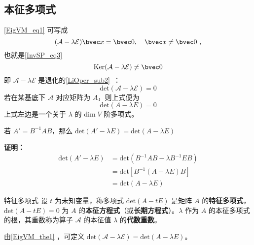 \subsection{本征多项式}
\autoref{EigVM_eq1} 可写成
\begin{equation}
(\mathcal{A-\lambda E})\bvec x=\bvec 0,\quad \bvec x\neq\bvec 0~,
\end{equation}
也就是\autoref{InvSP_eq3}~ 
\begin{equation}
\mathrm{Ker(\mathcal{A}-\lambda\mathcal{E})}\neq\bvec 0
\end{equation}
即 $\mathcal{A-\lambda E}$ 是退化的\autoref{LiOper_sub2}~：
\begin{equation}
\mathrm{det}(\mathcal{A-\lambda E})=0
\end{equation}
若在某基底下 $\mathcal{A}$ 对应矩阵为 $A$，则上式便为
\begin{equation}\label{EigVM_eq2}
\mathrm{det}(A-\lambda E)=0
\end{equation}
上式左边是一个关于 $\lambda$ 的 $\mathrm{dim}\;{V}$ 阶多项式。
\begin{theorem}{}\label{EigVM_the1}
若 $A'=B^{-1}AB$，那么 $\mathrm{det}(A'-\lambda E)=\mathrm{det}(A-\lambda E)$
\end{theorem}
\textbf{证明：}
\begin{equation}
\begin{aligned}
\mathrm{det}(A'-\lambda E)&=\mathrm{det}(B^{-1}AB-\lambda B^{-1}EB)\\
&=\mathrm{det}[B^{-1}(A-\lambda E)B]\\
&=\mathrm{det}(A-\lambda E)
\end{aligned}
\end{equation}
\begin{definition}{特征多项式}
设 $t$ 为未知变量，称多项式 $\mathrm{det}(A-tE)$ 是矩阵 $A$ 的\textbf{特征多项式}，$\mathrm{det}(A-tE)=0$ 为 $A$ 的\textbf{本征方程式}（或\textbf{长期方程式}）。$\lambda$ 作为 $A$ 的本征多项式的根，其重数称为算子 $\mathcal{A}$ 的本征值 $\lambda$ 的\textbf{代数重数}。
\end{definition}
由\autoref{EigVM_the1} ，可定义 $\mathrm{det}(\mathcal{A-\lambda E})=\mathrm{det}(A-\lambda E)$。

